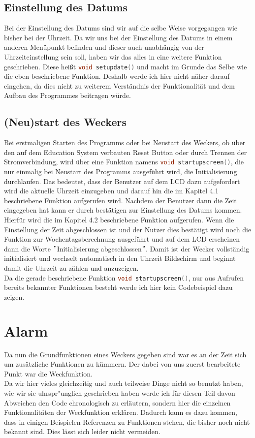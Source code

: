 \documentclass[openright,twoside,11pt,a4paper]{scrartcl}
\begin{document}
\begin{flushleft}
	 	\subsection{Einstellung des Datums}
	 	Bei der Einstellung des Datums sind wir auf die selbe Weise vorgegangen wie bisher bei der Uhrzeit. Da wir uns bei der Einstellung des Datums in einem anderen Menüpunkt befinden und dieser auch unabhängig von der Uhrzeiteinstellung sein soll, haben wir das alles in eine weitere Funktion geschrieben. Diese heißt \lstinline[language=c++,]|void setupdate()| und macht im Grunde das Selbe wie die eben beschriebene Funktion. Deshalb werde ich hier nicht näher darauf eingehen, da dies nicht zu weiterem Verständnis der Funktionalität und dem Aufbau des Programmes beitragen würde.
	 	\subsection{(Neu)start des Weckers}
	 	Bei erstmaligen Starten des Programms oder bei Neustart des Weckers, ob über den auf dem Education System verbauten Reset Button oder durch Trennen der Stromverbindung, wird über eine Funktion namens \lstinline[language=c++]|void startupscreen()|, die nur einmalig bei Neustart des Programms ausgeführt wird, die Initialisierung durchlaufen. Das bedeutet, dass der Benutzer auf dem LCD dazu aufgefordert wird die aktuelle Uhrzeit einzugeben und darauf hin die im Kapitel 4.1 beschriebene Funktion aufgerufen wird. Nachdem der Benutzer dann die Zeit eingegeben hat kann er durch bestätigen zur Einstellung des Datums kommen. Hierfür wird die im Kapitel 4.2 beschriebene Funktion aufgerufen. Wenn die Einstellung der Zeit abgeschlossen ist und der Nutzer dies bestätigt wird noch die Funktion zur Wochentagsberechnung ausgeführt und auf dem LCD erscheinen dann die Worte $"$Initialisierung abgeschlossen$"$. Damit ist der Wecker vollständig initialisiert und wechselt automatisch in den Uhrzeit Bildschirm und beginnt damit die Uhrzeit zu zählen und anzuzeigen. \\
	 	Da die gerade beschriebene Funktion \lstinline[language=c++]|void startupscreen()|, nur aus Aufrufen bereits bekannter Funktionen besteht werde ich hier kein Codebeispiel dazu zeigen. \\
	 	\section{Alarm}
	 	Da nun die Grundfunktionen eines Weckers gegeben sind war es an der Zeit sich um zusätzliche Funktionen zu kümmern. Der dabei von uns zuerst bearbeitete Punkt war die Weckfunktion. \\
	 	Da wir hier vieles gleichzeitig und auch teilweise Dinge nicht so benutzt haben, wie wir sie uhrspr"unglich geschrieben haben werde ich für diesen Teil davon Abweichen den Code chronologisch zu erläutern, sondern hier die einzelnen Funktionalitäten der Weckfunktion erklären. Dadurch kann es dazu kommen, dass in einigen Beispielen Referenzen zu Funktionen stehen, die bisher noch nicht bekannt sind. Dies lässt sich leider nicht vermeiden.

\end{flushleft}
\end{document}

